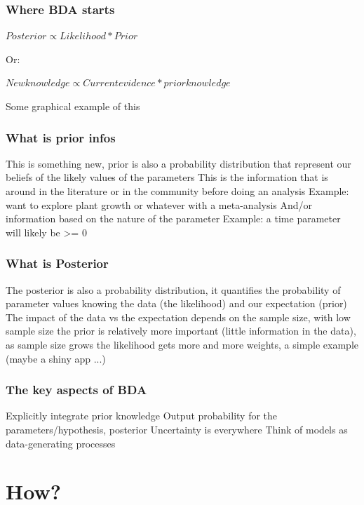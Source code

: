 \documentclass{beamer}
\begin{document}
 
 \begin{frame}
  \frametitle{\bf Where BDA starts}
  
  $Posterior \propto Likelihood * Prior$
  
  Or:
  
  $New knowledge \propto Current evidence * prior knowledge$
  
  Some graphical example of this
  
 \end{frame}

   \begin{frame}
  \frametitle{\bf What is prior infos}
  
  This is something new, prior is also a probability distribution that represent our beliefs of the likely values of the parameters
  This is the information that is around in the literature or in the community before doing an analysis
  Example: want to explore plant growth or whatever with a meta-analysis
  And/or information based on the nature of the parameter
  Example: a time parameter will likely be >= 0
  
 \end{frame}
 
  \begin{frame}
  \frametitle{\bf What is Posterior}
  
  The posterior is also a probability distribution, it quantifies the probability of parameter values knowing the data (the likelihood) and our expectation (prior)
  The impact of the data vs the expectation depends on the sample size, with low sample size the prior is relatively more important (little information in the data), as
  sample size grows the likelihood gets more and more weights, a simple example (maybe a shiny app ...)
  
  \end{frame}


 
 
\begin{frame}
 \frametitle{\bf The key aspects of BDA}
 
 Explicitly integrate prior knowledge 
 Output probability for the parameters/hypothesis, posterior
 Uncertainty is everywhere
 Think of models as data-generating processes
 
\end{frame}

\section{How?}
\end{document}
